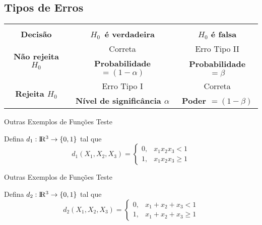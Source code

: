 \documentclass[12pt]{beamer}
\begin{document}
\subsection{Tipos de Erros}
\begin{frame}{}
\begin{block}{}
\begin{center}
\begin{table}[]
\begin{tabular}{c|c|c}
&&\\
                          \textbf{Decisão}                   &\textbf{$H_{0}\,$ é verdadeira}                         &\textbf{$H_{0}$ é falsa}\\ \hline
 \multirow{2}{*}{\textbf{Não rejeita $H_{0}$}}&Correta                                                               &Erro Tipo II\\
                                                                        &\textbf{Probabilidade $=\left(1-\alpha \right)$} &\textbf{Probabilidade $=\beta$}\\ \hline
\multirow{2}{*}{\textbf{Rejeita $H_{0}$}}       &Erro Tipo I                                                          &  Correta\\
                                                                        &\textbf{Nível de significância $\alpha$}            &\textbf{Poder $=\left( 1-\beta\right)$}\\ \hline
\end{tabular}
\end{table}
\end{center}
\end{block}
\end{frame}

\begin{frame}{Outras Exemplos de Funções Teste}
\begin{block}{}
\justifying
    Defina $d_{1}:\rm I\!R^{3}\rightarrow \{0,1\}$ tal que 
    \[
d_{1}(X_{1},X_{2},X_{3}) = 
  \begin{cases}
      0, & x_{1}x_{2}x_{3}<1 \\
      1, & x_{1}x_{2}x_{3} \geq 1 
  \end{cases}
\]
\end{block}
\end{frame}

\begin{frame}{Outras Exemplos de Funções Teste}
\begin{block}{}
\justifying
    Defina $d_{2}:\rm I\!R^{3}\rightarrow \{0,1\}$ tal que 
    \[
d_{2}(X_{1},X_{2},X_{3}) = 
  \begin{cases}
      0, & x_{1}+x_{2}+x_{3}<1 \\
      1, & x_{1}+x_{2}+x_{3} \geq 1 
  \end{cases}
\]
\end{block}
\end{frame}
\end{document}
